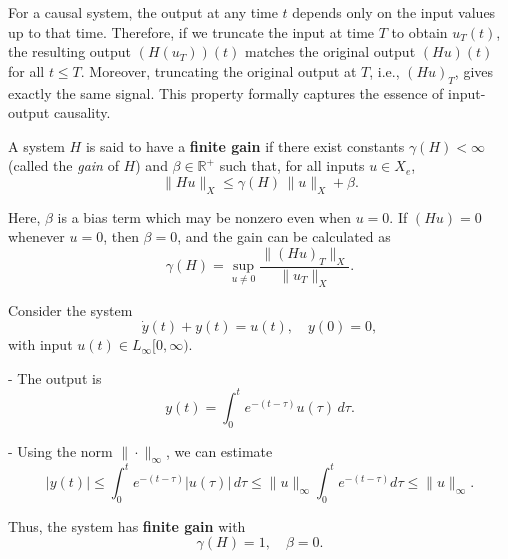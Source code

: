 \begin{example}
\begin{center}
\vspace{0.5cm}

\end{center}
\end{example}

\begin{remark}
For a causal system, the output at any time $t$ depends only on the input values up to that time. Therefore, if we truncate the input at time $T$ to obtain $u_T(t)$, the resulting output $(H(u_T))(t)$ matches the original output $(Hu)(t)$ for all $t \le T$. Moreover, truncating the original output at $T$, i.e., $(Hu)_T$, gives exactly the same signal. This property formally captures the essence of input-output causality.
\end{remark}

\begin{definition}
A system $H$ is said to have a \textbf{finite gain} if there exist constants 
\(\gamma(H) < \infty\) (called the \emph{gain} of $H$) and \(\beta \in \mathbb{R}^+\) such that, for all inputs \(u \in X_e\),
\[
\| Hu \|_X \le \gamma(H) \, \| u \|_X + \beta.
\]

Here, \(\beta\) is a bias term which may be nonzero even when \(u = 0\).  
If \((Hu) = 0\) whenever \(u = 0\), then \(\beta = 0\), and the gain can be calculated as
\[
\gamma(H) = \sup_{u \neq 0} \frac{\| (Hu)_T \|_X}{\| u_T \|_X}.
\]
\end{definition}

\begin{example}
Consider the system
\[
\dot{y}(t) + y(t) = u(t), \quad y(0)=0,
\]
with input \(u(t) \in L_\infty[0,\infty)\).  

- The output is 
\[
y(t) = \int_0^t e^{-(t-\tau)} u(\tau) \, d\tau.
\]  

- Using the norm \(\| \cdot \|_\infty\), we can estimate
\[
|y(t)| \le \int_0^t e^{-(t-\tau)} |u(\tau)| \, d\tau \le \| u \|_\infty \int_0^t e^{-(t-\tau)} d\tau \le \| u \|_\infty.
\]

Thus, the system has \textbf{finite gain} with 
\[
\gamma(H) = 1, \quad \beta = 0.
\]
\end{example}

